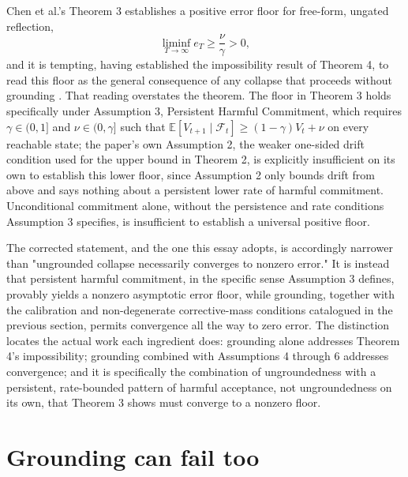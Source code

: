 \documentclass[11pt]{article}
\begin{document}
Chen et al.'s Theorem 3 establishes a positive error floor for free-form, ungated reflection,
$$\liminf_{T \to \infty} e_T \ge \frac{\nu}{\gamma} > 0,$$
and it is tempting, having established the impossibility result of Theorem 4, to read this floor as the general consequence of any collapse that proceeds without grounding \cite{chen2026bilevel}. That reading overstates the theorem. The floor in Theorem 3 holds specifically under Assumption 3, Persistent Harmful Commitment, which requires $\gamma \in (0,1]$ and $\nu \in (0,\gamma]$ such that $\mathbb{E}[V_{t+1} \mid \mathcal{F}_t] \ge (1-\gamma)V_t + \nu$ on every reachable state; the paper's own Assumption 2, the weaker one-sided drift condition used for the upper bound in Theorem 2, is explicitly insufficient on its own to establish this lower floor, since Assumption 2 only bounds drift from above and says nothing about a persistent lower rate of harmful commitment. Unconditional commitment alone, without the persistence and rate conditions Assumption 3 specifies, is insufficient to establish a universal positive floor.

The corrected statement, and the one this essay adopts, is accordingly narrower than "ungrounded collapse necessarily converges to nonzero error." It is instead that persistent harmful commitment, in the specific sense Assumption 3 defines, provably yields a nonzero asymptotic error floor, while grounding, together with the calibration and non-degenerate corrective-mass conditions catalogued in the previous section, permits convergence all the way to zero error. The distinction locates the actual work each ingredient does: grounding alone addresses Theorem 4's impossibility; grounding combined with Assumptions 4 through 6 addresses convergence; and it is specifically the combination of ungroundedness with a persistent, rate-bounded pattern of harmful acceptance, not ungroundedness on its own, that Theorem 3 shows must converge to a nonzero floor.

\section{Grounding can fail too}
\end{document}
